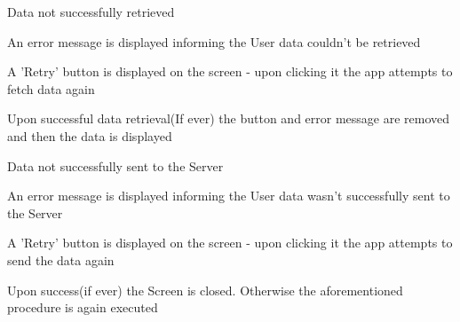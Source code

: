 \begin{packed_item}
				\begin{packed_item}
					\item[1.a] Data not successfully retrieved
					\item[] \begin{packed_enum}
						\item An error message is displayed informing the User data couldn't be retrieved
						\item A 'Retry' button is displayed on the screen - upon clicking it the app attempts to fetch data again
						\item Upon successful data retrieval(If ever) the button and error message are removed and then the data is displayed
					\end{packed_enum}
					
					\item[4.a] Data not successfully sent to the Server
					\item[] \begin{packed_enum}
						\item An error message is displayed informing the User data wasn't successfully sent to the Server
						\item A 'Retry' button is displayed on the screen - upon clicking it the app attempts to send the data again
						\item Upon success(if ever) the Screen is closed. Otherwise the aforementioned procedure is again executed
					\end{packed_enum}
				\end{packed_item}
			\end{packed_item}
			
